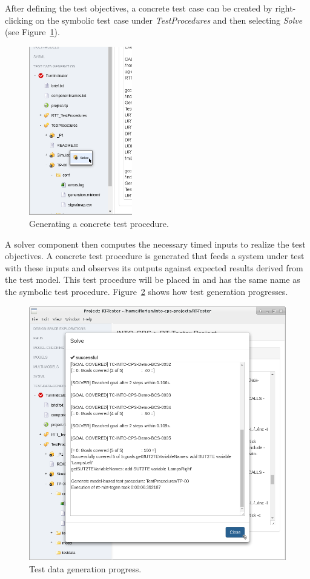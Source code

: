 After defining the test objectives, a concrete test case can be created by right-clicking on the symbolic test case under \emph{TestProcedures} and then
selecting \emph{Solve} (see Figure~\ref{figure:INTO-CPS-App:Solve}).
%
%
%
\begin{figure}[ht]
    \centerline{\includegraphics[width=0.4\textwidth]{figures/VSI-TDG_Solve}}
    \caption{Generating a concrete test procedure.}
    \label{figure:INTO-CPS-App:Solve}
\end{figure}
\clearpage
%
%
%
A solver component then computes the necessary timed inputs to realize the test
objectives. 
A concrete test procedure is generated that feeds a system under
test with these inputs and observes its outputs against expected results derived from the test model.
This test procedure will be placed in  and has the same
name as the symbolic test procedure. Figure~\ref{figure:INTO-CPS-App:Solve-Progress}
shows how test generation progresses.
%
%
%
\begin{figure}[ht]
    \centerline{\includegraphics[scale=0.4]{figures/VSI-TDG_Solve-Progress}}
    \caption{Test data generation progress.}
    \label{figure:INTO-CPS-App:Solve-Progress}
\end{figure}
%
%
%

